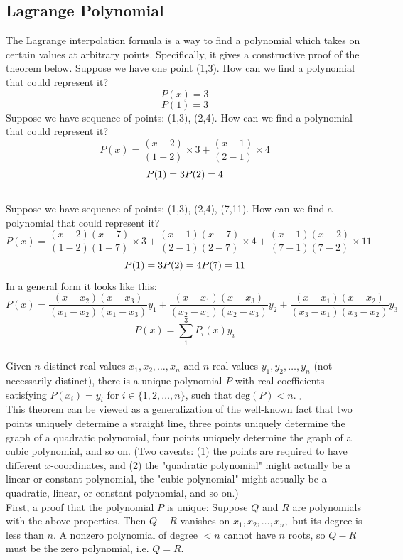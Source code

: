 \documentclass{article}
\begin{document}
\subsection{Lagrange Polynomial}
The Lagrange interpolation formula is a way to find a polynomial which takes on certain values at arbitrary points. Specifically, it gives a constructive proof of the theorem below.
\newline
Suppose we have one point (1,3). How can we find a polynomial that could represent it? \[ P(x) = 3 \] \[ P(1) = 3 \]\newline
Suppose we have sequence of points: (1,3), (2,4). How can we find a polynomial that could represent it? \[ P(x) = \frac {(x - 2)}{(1-2)} \times 3 + \frac {(x - 1)}{(2-1)} \times 4 \] \[P(1) = 3\\P(2) = 4 \]\\
Suppose we have sequence of points: (1,3), (2,4), (7,11). How can we find a polynomial that could represent it? \[ P(x) = \frac {(x-2)(x-7)}{(1-2)(1-7)} \times 3 + \frac {(x-1)(x-7)}{(2-1)(2-7)} \times 4 + \frac {(x-1)(x-2)}{(7-1)(7-2)} \times 11 \] \[P(1) = 3\\P(2) = 4\\P(7) = 11 \] In a general form it looks like this: \[ P ( x ) = \frac { \left( x - x _ { 2 } \right) \left( x - x _ { 3 } \right) } { \left( x _ { 1 } - x _ { 2 } \right) \left( x _ { 1 } - x _ { 3 } \right) } y _ { 1 } + \frac { \left( x - x _ { 1 } \right) \left( x - x _ { 3 } \right) } { \left( x _ { 2 } - x _ { 1 } \right) \left( x _ { 2 } - x _ { 3 } \right) } y _ { 2 } + \frac { \left( x - x _ { 1 } \right) \left( x - x _ { 2 } \right) } { \left( x _ { 3 } - x _ { 1 } \right) \left( x _ { 3 } - x _ { 2 } \right) } y _ { 3 } \] \[ P(x) = \sum _1^3 P_i (x) y_i \]\\ 
Given \( n \) distinct real values \( x_1, x_2, \ldots, x_n \) and \( n \) real values \( y_1, y_2, \ldots, y_n\) (not necessarily distinct), there is a unique polynomial \(P\) with real coefficients satisfying \( P(x_i)=y_i\) for \( i \in \{ 1,2, \ldots, n \} \), such that \( \text{deg}(P) < n.\) \(_\square\)\\
This theorem can be viewed as a generalization of the well-known fact that two points uniquely determine a straight line, three points uniquely determine the graph of a quadratic polynomial, four points uniquely determine the graph of a cubic polynomial, and so on. (Two caveats: (1) the points are required to have different \(x\)-coordinates, and (2) the "quadratic polynomial" might actually be a linear or constant polynomial, the "cubic polynomial" might actually be a quadratic, linear, or constant polynomial, and so on.)\\
First, a proof that the polynomial \( P \) is unique: Suppose \( Q\) and \( R\) are polynomials with the above properties. Then \( Q-R\) vanishes on \( x_1,x_2,\ldots,x_n,\) but its degree is less than \( n.\) A nonzero polynomial of degree \( <n\) cannot have \(n\) roots, so \( Q-R\) must be the zero polynomial, i.e. \( Q=R.\)
\end{document}
